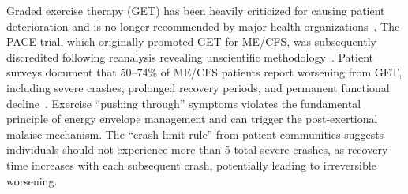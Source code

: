 \begin{warning}
\label{warn:get-harmful}
Graded exercise therapy (GET) has been heavily criticized for causing patient deterioration and is no longer recommended by major health organizations~\cite{NICE2021mecfs}. The PACE trial, which originally promoted GET for ME/CFS, was subsequently discredited following reanalysis revealing unscientific methodology~\cite{Wilshire2018}. Patient surveys document that 50--74\% of ME/CFS patients report worsening from GET, including severe crashes, prolonged recovery periods, and permanent functional decline~\cite{EatonFitch2019}. Exercise ``pushing through'' symptoms violates the fundamental principle of energy envelope management and can trigger the post-exertional malaise mechanism. The ``crash limit rule'' from patient communities suggests individuals should not experience more than 5 total severe crashes, as recovery time increases with each subsequent crash, potentially leading to irreversible worsening.
\end{warning}

